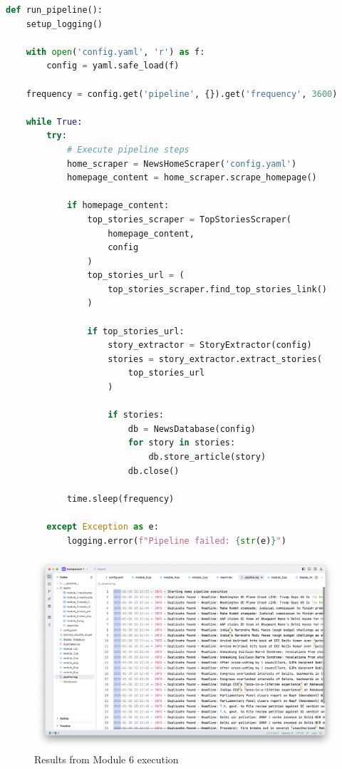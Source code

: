 \documentclass{article}
\begin{document}
\begin{lstlisting}[language=Python]
def run_pipeline():
    setup_logging()
    
    with open('config.yaml', 'r') as f:
        config = yaml.safe_load(f)
    
    frequency = config.get('pipeline', {}).get('frequency', 3600)
    
    while True:
        try:
            # Execute pipeline steps
            home_scraper = NewsHomeScraper('config.yaml')
            homepage_content = home_scraper.scrape_homepage()
            
            if homepage_content:
                top_stories_scraper = TopStoriesScraper(
                    homepage_content, 
                    config
                )
                top_stories_url = (
                    top_stories_scraper.find_top_stories_link()
                )
                
                if top_stories_url:
                    story_extractor = StoryExtractor(config)
                    stories = story_extractor.extract_stories(
                        top_stories_url
                    )
                    
                    if stories:
                        db = NewsDatabase(config)
                        for story in stories:
                            db.store_article(story)
                        db.close()
            
            time.sleep(frequency)
            
        except Exception as e:
            logging.error(f"Pipeline failed: {str(e)}")
\end{lstlisting}

\begin{figure}[H]
    \centering
    \includegraphics[width=\textwidth]{report/module_6.png}
    \caption{Results from Module 6 execution}
    \label{fig:module6-results}
\end{figure}
\end{document}
